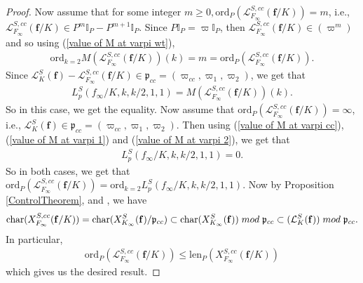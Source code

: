 \documentclass[reqno,10pt]{amsart}
\newcommand{\I}{\mathbb{I}}
\newcommand{\f}{\mathbf{f}}
\newcommand{\mcL}{\mathcal{L}}
\theoremstyle{plain}
\theoremstyle{definition}
\begin{document}
\begin{proof}
    Now assume that for some integer $m \geq 0, \mathrm{ord}_P(\mcL_{F_\infty}^{S,cc}(\f/K)) = m$, i.e., $\mcL_{F_\infty}^{S,cc}(\f/K) \in P^m\I_P - P^{m+1}\I_P$. Since $P\I_P = \varpi \I_P$, then $\mcL_{F_\infty}^{S,cc}(\f/K) \in (\varpi^m)$ and so using (\ref{value of M at varpi wt}),
    \begin{align*}
        \mathrm{ord}_{k=2}M(\mcL_{F_\infty}^{S,cc}(\f/K))(k) = m = \mathrm{ord}_P(\mcL_{F_\infty}^{S,cc}(\f/K)).
    \end{align*}
    Since $\mcL_K^S(\f) - \mcL_{F_\infty}^{S,cc}(\f/K) \in \mathfrak{p}_{cc} = (\varpi_{cc},\varpi_1,\varpi_2)$, we get that
    \begin{align*}
        L_p^S(f_\infty/K,k,k/2,1,1) = M(\mcL_{F_\infty}^{S,cc}(\f/K))(k).
    \end{align*}
    So in this case, we get the equality. Now assume that $\mathrm{ord}_P(\mcL_{F_\infty}^{S,cc}(\f/K)) = \infty$, i.e., $\mcL_K^S(\f) \in \mathfrak{p}_{cc} = (\varpi_{cc},\varpi_1,\varpi_2)$. Then using (\ref{value of M at varpi cc}),(\ref{value of M at varpi 1}) and (\ref{value of M at varpi 2}), we get that 
    \begin{align*}
        L_p^S(f_\infty/K,k,k/2,1,1) = 0.
    \end{align*}
    So in both cases, we get that $\mathrm{ord}_P(\mcL_{F_\infty}^{S,cc}(\f/K)) = \mathrm{ord}_{k=2} L_p^S(f_\infty/K,k,k/2,1,1)$. Now by Proposition \ref{ControlTheorem}, \cite[Corollary 3.8]{SkinnerUrban} and \cite[Theorem 101]{Wan}, we have
    \begin{align*}
        \mathrm{char}(X_{F_\infty}^{S,cc}(\f/K)) = \mathrm{char}(X_{K_\infty}^S(\f)/\mathfrak{p}_{cc}) \subset \mathrm{char}(X_{K_\infty}^S(\f)) \hspace{1mm} mod \hspace{1mm} \mathfrak{p}_{cc} \subset (\mcL_K^S(\f)) \hspace{1mm} mod \hspace{1mm} \mathfrak{p}_{cc}.
    \end{align*}
    In particular,
    \begin{align*}
        \mathrm{ord}_P(\mcL_{F_\infty}^{S,cc}(\f/K)) \leq \mathrm{len}_P(X_{F_\infty}^{S,cc}(\f/K))
    \end{align*}
    which gives us the desired result.
\end{proof}
\end{document}
